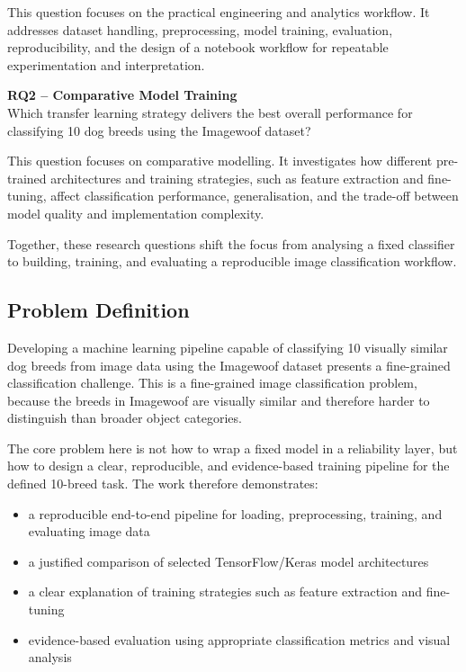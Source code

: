 \documentclass[12pt, a4paper]{article}
\begin{document}
This question focuses on the practical engineering and analytics workflow. It addresses dataset handling, preprocessing, model training, evaluation, reproducibility, and the design of a notebook workflow for repeatable experimentation and interpretation.

\textbf{RQ2 -- Comparative Model Training}\\
Which transfer learning strategy delivers the best overall performance for classifying 10 dog breeds using the Imagewoof dataset?

This question focuses on comparative modelling. It investigates how different pre-trained architectures and training strategies, such as feature extraction and fine-tuning, affect classification performance, generalisation, and the trade-off between model quality and implementation complexity.

Together, these research questions shift the focus from analysing a fixed classifier to building, training, and evaluating a reproducible image classification workflow.

\subsection{Problem Definition}

Developing a machine learning pipeline capable of classifying 10 visually similar dog breeds from image data using the Imagewoof dataset presents a fine-grained classification challenge. This is a fine-grained image classification problem, because the breeds in Imagewoof are visually similar and therefore harder to distinguish than broader object categories.

The core problem here is not how to wrap a fixed model in a reliability layer, but how to design a clear, reproducible, and evidence-based training pipeline for the defined 10-breed task. The work therefore demonstrates:

\begin{itemize}
  \item a reproducible end-to-end pipeline for loading, preprocessing, training, and evaluating image data
  \item a justified comparison of selected TensorFlow/Keras model architectures
  \item a clear explanation of training strategies such as feature extraction and fine-tuning
  \item evidence-based evaluation using appropriate classification metrics and visual analysis
\end{itemize}
\end{document}
